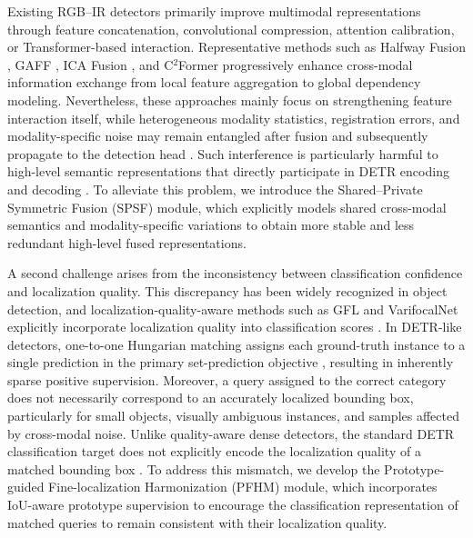\documentclass[letterpaper,journal]{IEEEtran}
\begin{document}
Existing RGB--IR detectors primarily improve multimodal representations through feature concatenation, convolutional compression, attention calibration, or Transformer-based interaction. Representative methods such as Halfway Fusion \cite{halfway}, GAFF \cite{gaff}, ICA Fusion \cite{icafusion}, and C$^2$Former \cite{c2former} progressively enhance cross-modal information exchange from local feature aggregation to global dependency modeling. Nevertheless, these approaches mainly focus on strengthening feature interaction itself, while heterogeneous modality statistics, registration errors, and modality-specific noise may remain entangled after fusion and subsequently propagate to the detection head \cite{c2former,damsdet}. Such interference is particularly harmful to high-level semantic representations that directly participate in DETR encoding and decoding \cite{detr,rtdetr}. To alleviate this problem, we introduce the Shared--Private Symmetric Fusion (SPSF) module, which explicitly models shared cross-modal semantics and modality-specific variations to obtain more stable and less redundant high-level fused representations.

A second challenge arises from the inconsistency between classification confidence and localization quality. This discrepancy has been widely recognized in object detection, and localization-quality-aware methods such as GFL and VarifocalNet explicitly incorporate localization quality into classification scores \cite{gfl,varifocalnet}. In DETR-like detectors, one-to-one Hungarian matching assigns each ground-truth instance to a single prediction in the primary set-prediction objective \cite{detr}, resulting in inherently sparse positive supervision. Moreover, a query assigned to the correct category does not necessarily correspond to an accurately localized bounding box, particularly for small objects, visually ambiguous instances, and samples affected by cross-modal noise. Unlike quality-aware dense detectors, the standard DETR classification target does not explicitly encode the localization quality of a matched bounding box \cite{detr,varifocalnet}. To address this mismatch, we develop the Prototype-guided Fine-localization Harmonization (PFHM) module, which incorporates IoU-aware prototype supervision to encourage the classification representation of matched queries to remain consistent with their localization quality.
\end{document}
